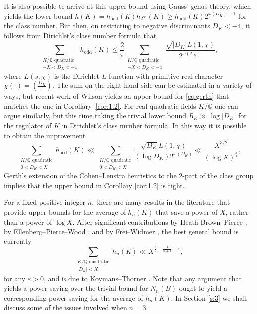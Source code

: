\documentclass[reqno, 12pt, twoside]{amsart}
\numberwithin{equation}{section}
\newcommand{\QQ}{\mathbb{Q}}
\newcommand{\ve}{\varepsilon}
\newcommand{\0}{\mathbf{0}}
\theoremstyle{definition}
\renewcommand{\leq}{\leqslant}
\renewcommand{\geq}{\geqslant}
\begin{document}
It is also possible to arrive at this upper bound using Gauss' genus theory, which yields the lower  bound 
$h(K)=h_{\text{odd}}(K)h_{2^\infty}(K)\geq h_{\text{odd}}(K)2^{\omega(D_K)-1}$ for the class number. 
But then, on restricting to negative discriminants $D_K<-4$, it follows from 
Dirichlet's class number formula that 
\begin{equation}\label{eq:gerth}
\sum_{
\substack{K/\QQ \text{ quadratic}\\
-X<D_K<-4
}}  h_\text{odd}(K)\leq 
\frac{2}{\pi}
\sum_{
\substack{K/\QQ \text{ quadratic}\\
-X<D_K<-4
}}  \frac{\sqrt{|D_K|}L(1,\chi)}{2^{\omega(D_K)}},
\end{equation}
where 
 $L(s,\chi)$ is the Dirichlet $L$-function 
 with primitive real character $\chi(\cdot)=(\frac{D_K}{\cdot})$. 
 The sum on the right hand side can be estimated in a variety of ways, but recent work of Wilson \cite[Cor.~1.6]{wilson} yields an upper bound for 
\eqref{eq:gerth} that matches the one in Corollary~\ref{cor:1.2}.
For real quadratic fields $K/\QQ$ one can argue similarly, but this time taking the trivial lower bound $R_K\gg \log |D_K|$ for the regulator of $K$ in Dirichlet's class number formula.
In this way it is possible to obtain the improvement 
$$
\sum_{
\substack{K/\QQ \text{ quadratic}\\
0<D_K<X
}}  h_\text{odd}(K)
\ll 
\sum_{
\substack{K/\QQ \text{ quadratic}\\
0<D_K<X
}}  \frac{\sqrt{D_K}L(1,\chi)}{(\log D_K) 2^{\omega(D_K)}}
\ll\frac{X^{3/2}}{(\log X)^{\frac{3}{2}}}.
$$
 Gerth's  \cite{gerth1,gerth2} extension of the Cohen--Lenstra heuristics to the $2$-part of the class group implies that 
the upper bound in 
Corollary \ref{cor:1.2} is tight. 


For a fixed positive integer $n$, 
there are many results in the literature 
that provide 
upper bounds for the average of $h_n(K)$
that save a power of $X$, rather than a power of $\log X$. 
After significant contributions by 
Heath-Brown--Pierce \cite{hb-p}, by 
Ellenberg--Pierce--Wood 
\cite{pierce2}, and 
by Frei--Widmer
\cite{frei},
the best general bound is
currently 
$$
\sum_{
\substack{K/\QQ \text{ quadratic}\\
|D_K|<X
}}  h_n(K)\ll X^{\frac{3}{2}
-\frac{1}{n+1}+\ve},
$$
for any $\ve>0$, and is 
due to  Koymans--Thorner \cite{koy}.
Note that any argument that yields a power-saving over the trivial  
bound for  $N_n(B)$
ought to yield a corresponding power-saving for the average of $h_n(K)$.
In Section \ref{s:3} we shall discuss some of the  issues involved when 
$n=3$. 
\end{document}
